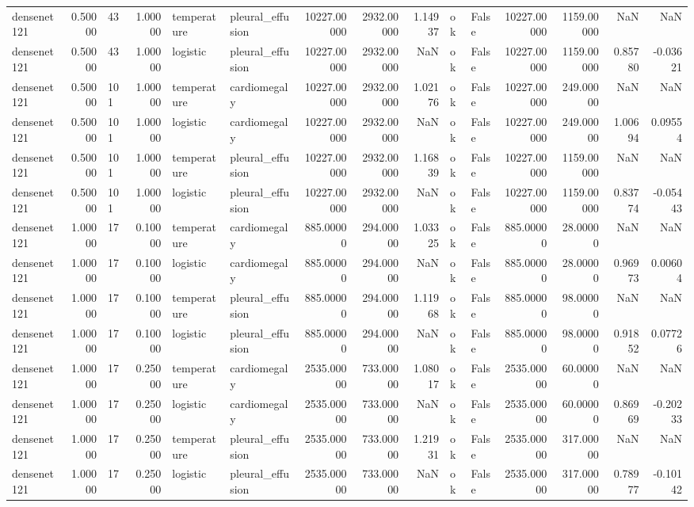 \begin{tabular}{lrlrllrrrllrrrr}
densenet121 & 0.50000 & 43 & 1.00000 & temperature & pleural\_effusion & 10227.00000 & 2932.00000 & 1.14937 & ok & False & 10227.00000 & 1159.00000 & NaN & NaN \\
densenet121 & 0.50000 & 43 & 1.00000 & logistic & pleural\_effusion & 10227.00000 & 2932.00000 & NaN & ok & False & 10227.00000 & 1159.00000 & 0.85780 & -0.03621 \\
densenet121 & 0.50000 & 101 & 1.00000 & temperature & cardiomegaly & 10227.00000 & 2932.00000 & 1.02176 & ok & False & 10227.00000 & 249.00000 & NaN & NaN \\
densenet121 & 0.50000 & 101 & 1.00000 & logistic & cardiomegaly & 10227.00000 & 2932.00000 & NaN & ok & False & 10227.00000 & 249.00000 & 1.00694 & 0.09554 \\
densenet121 & 0.50000 & 101 & 1.00000 & temperature & pleural\_effusion & 10227.00000 & 2932.00000 & 1.16839 & ok & False & 10227.00000 & 1159.00000 & NaN & NaN \\
densenet121 & 0.50000 & 101 & 1.00000 & logistic & pleural\_effusion & 10227.00000 & 2932.00000 & NaN & ok & False & 10227.00000 & 1159.00000 & 0.83774 & -0.05443 \\
densenet121 & 1.00000 & 17 & 0.10000 & temperature & cardiomegaly & 885.00000 & 294.00000 & 1.03325 & ok & False & 885.00000 & 28.00000 & NaN & NaN \\
densenet121 & 1.00000 & 17 & 0.10000 & logistic & cardiomegaly & 885.00000 & 294.00000 & NaN & ok & False & 885.00000 & 28.00000 & 0.96973 & 0.00604 \\
densenet121 & 1.00000 & 17 & 0.10000 & temperature & pleural\_effusion & 885.00000 & 294.00000 & 1.11968 & ok & False & 885.00000 & 98.00000 & NaN & NaN \\
densenet121 & 1.00000 & 17 & 0.10000 & logistic & pleural\_effusion & 885.00000 & 294.00000 & NaN & ok & False & 885.00000 & 98.00000 & 0.91852 & 0.07726 \\
densenet121 & 1.00000 & 17 & 0.25000 & temperature & cardiomegaly & 2535.00000 & 733.00000 & 1.08017 & ok & False & 2535.00000 & 60.00000 & NaN & NaN \\
densenet121 & 1.00000 & 17 & 0.25000 & logistic & cardiomegaly & 2535.00000 & 733.00000 & NaN & ok & False & 2535.00000 & 60.00000 & 0.86969 & -0.20233 \\
densenet121 & 1.00000 & 17 & 0.25000 & temperature & pleural\_effusion & 2535.00000 & 733.00000 & 1.21931 & ok & False & 2535.00000 & 317.00000 & NaN & NaN \\
densenet121 & 1.00000 & 17 & 0.25000 & logistic & pleural\_effusion & 2535.00000 & 733.00000 & NaN & ok & False & 2535.00000 & 317.00000 & 0.78977 & -0.10142 \\

\end{tabular}
